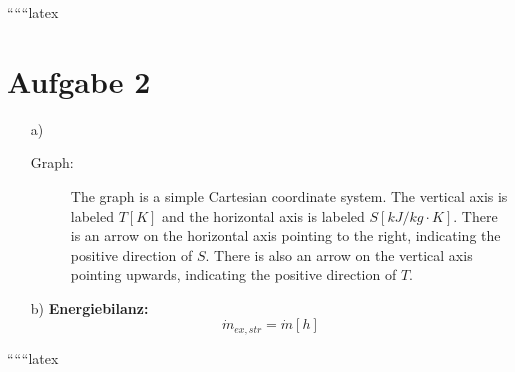 
``````latex


\section*{Aufgabe 2}

\begin{itemize}
    \item[a)] 
    \begin{description}
        \item[Graph:] The graph is a simple Cartesian coordinate system. The vertical axis is labeled \( T [K] \) and the horizontal axis is labeled \( S [kJ / {kg \cdot K}] \). There is an arrow on the horizontal axis pointing to the right, indicating the positive direction of \( S \). There is also an arrow on the vertical axis pointing upwards, indicating the positive direction of \( T \).
    \end{description}
    
    \item[b)] 
    \textbf{Energiebilanz:}
    \[
    \dot{m}_{ex, str} = \dot{m} \left[ h \right]
    \]
\end{itemize}

``````latex


